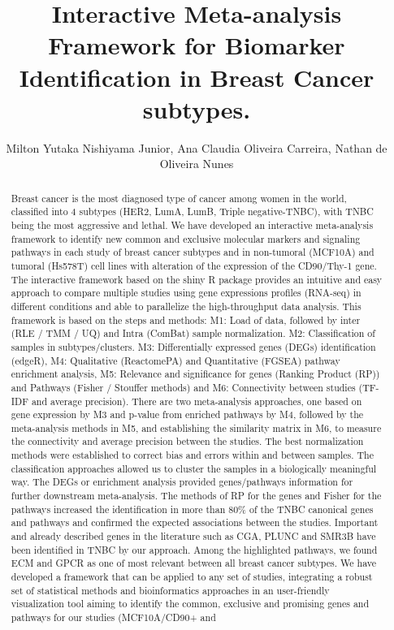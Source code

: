 \documentclass[twoside]{article}
\title{\vspace{-15mm}\fontsize{24pt}{10pt}\selectfont\textbf{ Interactive Meta-analysis Framework for Biomarker Identification in Breast Cancer subtypes. }} %
\author{ Milton Yutaka Nishiyama Junior,  Ana Claudia Oliveira Carreira,  Nathan de Oliveira Nunes }
\affil{ Instituto Butantan,  Instituto Butantan }
\date{}
\begin{document}
  
  
  \maketitle %
  
  
  \thispagestyle{fancy} %
  
  
  \begin{abstract}
  Breast cancer is the most diagnosed type of cancer among women in the world,  classified into 4 subtypes (HER2,  LumA,  LumB,  Triple negative-TNBC),  with TNBC being the most aggressive and lethal. We have developed an interactive meta-analysis framework to identify new common and exclusive molecular markers and signaling pathways in each study of breast cancer subtypes and in non-tumoral (MCF10A) and tumoral (Hs578T) cell lines with alteration of the expression of the CD90/Thy-1 gene. The interactive framework based on the shiny R package provides an intuitive and easy approach to compare multiple studies using gene expressions profiles (RNA-seq) in different conditions and able to parallelize the high-throughput data analysis. This framework is based on the steps and methods: M1: Load of data,  followed by inter (RLE / TMM / UQ) and Intra (ComBat) sample normalization. M2: Classification of samples in subtypes/clusters. M3: Differentially expressed genes (DEGs) identification (edgeR),  M4: Qualitative (ReactomePA) and Quantitative (FGSEA) pathway enrichment analysis,  M5: Relevance and significance for genes (Ranking Product (RP)) and Pathways (Fisher / Stouffer methods) and M6: Connectivity between studies (TF-IDF and average precision). There are two meta-analysis approaches,  one based on gene expression by M3 and p-value from enriched pathways by M4,  followed by the meta-analysis methods in M5,  and establishing the similarity matrix in M6,  to measure  the connectivity and average precision between the studies. The best normalization methods were established to correct bias and errors within and between samples. The classification approaches allowed us to cluster the samples in a biologically meaningful way. The DEGs or enrichment analysis provided genes/pathways information for further downstream meta-analysis. The methods of RP for the genes and Fisher for the pathways increased the identification in more than 80\% of the TNBC canonical genes and pathways and confirmed the expected associations between the studies. Important and already described genes in the literature such as CGA,  PLUNC and SMR3B have been identified in TNBC by our approach. Among the highlighted pathways,  we found ECM and GPCR as one of most relevant between all breast cancer subtypes. We have developed a framework that can be applied to any set of studies,  integrating a robust set of statistical methods and bioinformatics approaches in an user-friendly visualization tool aiming to identify the common,  exclusive and promising genes and pathways for our studies (MCF10A/CD90+ and 
\end{abstract}
\end{document}
